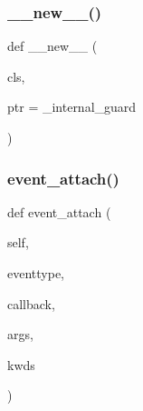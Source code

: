 \subsubsection{\texorpdfstring{\+\_\+\+\_\+new\+\_\+\+\_\+()}{\_\_new\_\_()}}
{\footnotesize\ttfamily def \+\_\+\+\_\+new\+\_\+\+\_\+ (\begin{DoxyParamCaption}\item[{}]{cls,  }\item[{}]{ptr = {\ttfamily \+\_\+internal\+\_\+guard} }\end{DoxyParamCaption})}

\mbox{\label{classvlc_1_1_event_manager_a969b667ff0326d1baa70343bc882c29d}} 
\subsubsection{\texorpdfstring{event\+\_\+attach()}{event\_attach()}}
{\footnotesize\ttfamily def event\+\_\+attach (\begin{DoxyParamCaption}\item[{}]{self,  }\item[{}]{eventtype,  }\item[{}]{callback,  }\item[{}]{args,  }\item[{}]{kwds }\end{DoxyParamCaption})}

